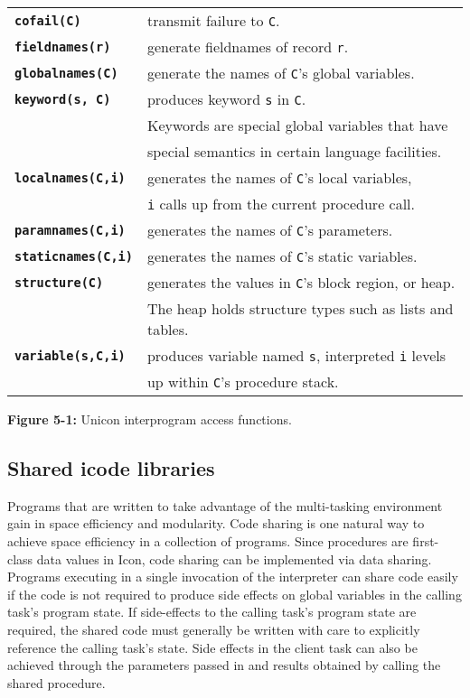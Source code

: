 \begin{center}

\begin{tabular}{|ll|} \hline
{\bf\tt cofail(C)}      & transmit failure to {\tt C}. \\
{\bf\tt fieldnames(r)}  & generate fieldnames of record {\tt r}. \\
{\bf\tt globalnames(C)} & generate the names of {\tt C}'s global
variables. \\
{\bf\tt keyword(s, C)} & produces keyword {\tt s} in {\tt C}. \\
	& Keywords are special global variables that have \\
	& special semantics in certain language facilities.\\
{\bf\tt localnames(C,i)} & generates the names of {\tt C}'s local variables,\\
	& {\tt i} calls up from the current procedure call. \\
{\bf\tt paramnames(C,i)} & generates the names of {\tt C}'s parameters. \\
{\bf\tt staticnames(C,i)} & generates the names of {\tt C}'s static variables. \\
{\bf\tt structure(C)} & generates the values in {\tt C}'s block
region, or heap. \\
	 & The heap holds structure types such as lists and tables. \\
{\bf\tt variable(s,C,i)} & produces variable named {\tt s}, interpreted {\tt i} levels\\
	& up within {\tt C}'s procedure stack. \\
\hline
\end{tabular}
\end{center}

{\sffamily\bfseries Figure 5-1:}
{\sffamily Unicon interprogram access functions.}



\subsection{Shared icode libraries}

Programs that are written to take advantage of the multi-tasking environment
gain in space efficiency and modularity. Code sharing is one natural way to
achieve space efficiency in a collection of programs. Since procedures are
first-class data values in Icon, code sharing can be implemented via data
sharing. Programs executing in a single invocation of the interpreter can share
code easily if the code is not required to produce side effects on global
variables in the calling task's program state. If side-effects to the calling
task's program state are required, the shared code must generally be written
with care to explicitly reference the calling task's state. Side effects in the
client task can also be achieved through the parameters passed in and results
obtained by calling the shared procedure.

